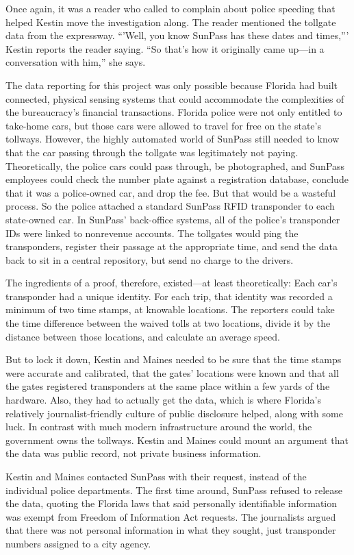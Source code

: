 Once again, it was a reader who called to complain about police speeding
that helped Kestin move the investigation along. The reader mentioned the
tollgate data from the expressway. ``'Well, you know SunPass has these dates
and times,''' Kestin reports the reader saying. ``So that's how it originally
came up—in a conversation with him,'' she says.

The data reporting for this project was only possible because Florida had
built connected, physical sensing systems that could accommodate the
complexities of the bureaucracy's financial transactions. Florida police were
not only entitled to take-home cars, but those cars were allowed to travel
for free on the state's tollways. However, the highly automated world of
SunPass still needed to know that the car passing through the tollgate was
legitimately not paying. Theoretically, the police cars could pass through,
be photographed, and SunPass employees could check the number plate
against a registration database, conclude that it was a police-owned car, and
drop the fee. But that would be a wasteful process. So the police attached a
standard SunPass RFID transponder to each state-owned car. In SunPass'
back-office systems, all of the police's transponder IDs were linked to nonrevenue
accounts. The tollgates would ping the transponders, register their
passage at the appropriate time, and send the data back to sit in a central
repository, but send no charge to the drivers.

The ingredients of a proof, therefore, existed—at least theoretically: Each
car's transponder had a unique identity. For each trip, that identity was
recorded a minimum of two time stamps, at knowable locations. The
reporters could take the time difference between the waived tolls at two
locations, divide it by the distance between those locations, and calculate
an average speed.

But to lock it down, Kestin and Maines needed to be sure that the time
stamps were accurate and calibrated, that the gates' locations were known
and that all the gates registered transponders at the same place within a
few yards of the hardware. Also, they had to actually get the data, which
is where Florida's relatively journalist-friendly culture of public disclosure helped, along with some luck. In contrast with much modern infrastructure
around the world, the government owns the tollways. Kestin and Maines
could mount an argument that the data was public record, not private business
information.

Kestin and Maines contacted SunPass with their request, instead of the
individual police departments. The first time around, SunPass refused to
release the data, quoting the Florida laws that said personally identifiable
information was exempt from Freedom of Information Act requests. The
journalists argued that there was not personal information in what they
sought, just transponder numbers assigned to a city agency.

